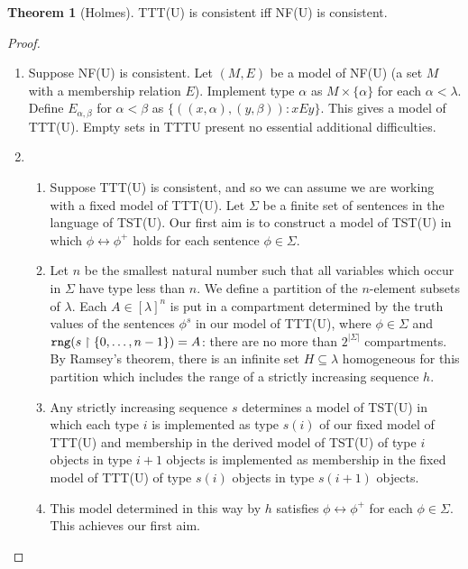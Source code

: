 \documentclass[112pt]{article}
\theoremstyle{definition}
\newtheorem{theorem}{Theorem}[section]
\theoremstyle{remark}
\begin{document}
\begin{theorem}[Holmes]
  TTT(U) is consistent iff NF(U) is consistent.
\end{theorem}
\begin{proof}\mbox\negthinspace %
\begin{enumerate}
\item Suppose NF(U) is consistent.  Let $(M,E)$ be a model of NF(U) (a set $M$ with a membership relation $E$).  Implement type $\alpha$ as $M \times \{\alpha\}$ for
each $\alpha<\lambda$.  Define $E_{\alpha,\beta}$ for $\alpha<\beta$ as $\{((x,\alpha),(y,\beta)):xEy\}$.  This gives a model of TTT(U).   Empty sets in TTTU present no essential additional difficulties.

\item \begin{enumerate}


\item Suppose TTT(U) is consistent, and so we can assume we are working with a fixed model of TTT(U).  Let $\Sigma$ be a finite set of sentences in the language of TST(U).  Our first aim is to construct a model of TST(U) in which $\phi \leftrightarrow \phi^+$ holds for each sentence $\phi \in \Sigma$.

\item Let $n$ be the smallest natural number such that all variables which occur in $\Sigma$ have type less than $n$. We define a partition of the $n$-element subsets of $\lambda$.  Each $A \in [\lambda]^n$ is put in a compartment
determined by the truth values of the sentences $\phi^s$ in our model of TTT(U), where $\phi \in \Sigma$ and ${\tt rng}(s \restriction \{0,\ldots,n-1\}) = A$:  there are no more than $2^{|\Sigma|}$ compartments.  By Ramsey's theorem, there is an infinite set $H \subseteq \lambda$ homogeneous for this partition  which includes the range of a strictly increasing sequence $h$.

\item Any strictly increasing sequence $s$ determines a model of TST(U) in which each type $i$ is implemented as type $s(i)$ of our fixed model of TTT(U)  and membership in the derived model of TST(U) of type $i$ objects in type $i+1$ objects is implemented as membership in the fixed model of TTT(U) of type $s(i)$ objects in type $s(i+1)$ objects.

\item This model determined in this way by $h$ satisfies  $\phi \leftrightarrow \phi^+$ for each $\phi \in \Sigma$.   This achieves our first aim.


\end{enumerate}
\end{enumerate}
\end{proof}
\end{document}
